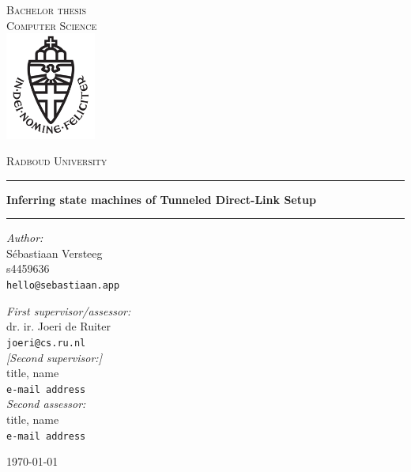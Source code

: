 \documentclass[11pt,a4paper]{report}
\begin{document}
\begin{titlepage}
\begin{center}
\textsc{\LARGE Bachelor thesis\\Computer Science}\\[1.5cm]
\includegraphics[height=100pt]{logo}

\vspace{0.4cm}
\textsc{\Large Radboud University}\\[1cm]
\hrule
\vspace{0.4cm}
\textbf{\huge Inferring state machines of Tunneled Direct-Link Setup}\\[0.4cm]
\hrule
\vspace{2cm}
\begin{minipage}[t]{0.45\textwidth}
\begin{flushleft} \large
\textit{Author:}\\
S\'ebastiaan Versteeg\\
s4459636\\
\texttt{hello@sebastiaan.app}\\
\end{flushleft}
\end{minipage}
\begin{minipage}[t]{0.45\textwidth}
\begin{flushright} \large
\textit{First supervisor/assessor:}\\
dr. ir. Joeri de Ruiter\\
\texttt{joeri@cs.ru.nl}\\[1.3cm]
\textit{[Second supervisor:]}\\
title, name\\
\texttt{e-mail address}\\[1.3cm]
\textit{Second assessor:}\\
title, name\\
\texttt{e-mail address}
\end{flushright}
\end{minipage}
\vfill
{\large \today}
\end{center}
\end{titlepage}



\tableofcontents










\begin{appendices}

\end{appendices}
\end{document}
